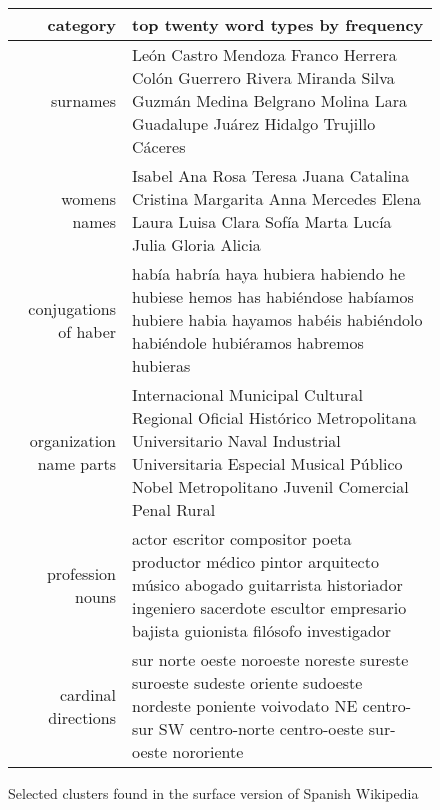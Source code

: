\begin{figure*}[t!]
  \begin{tabular}{|r|p{10cm}|}
    \hline
    category  & top twenty word types by frequency \\
    \hline
    surnames & León Castro Mendoza Franco Herrera Colón Guerrero Rivera Miranda
    Silva Guzmán Medina Belgrano Molina Lara Guadalupe Juárez Hidalgo Trujillo
    Cáceres \\
    \hline
    womens names & Isabel Ana Rosa Teresa Juana Catalina Cristina Margarita
    Anna Mercedes Elena Laura Luisa Clara Sofía Marta Lucía Julia Gloria Alicia
    \\
    \hline
    conjugations of haber & había habría haya hubiera habiendo he hubiese hemos
    has habiéndose habíamos hubiere habia hayamos habéis habiéndolo habiéndole
    hubiéramos habremos hubieras \\
    \hline
    organization name parts & Internacional Municipal Cultural Regional
    Oficial Histórico Metropolitana Universitario Naval Industrial
    Universitaria Especial Musical Público Nobel Metropolitano Juvenil
    Comercial Penal Rural \\
    \hline
    profession nouns & actor escritor compositor poeta productor médico pintor
    arquitecto músico abogado guitarrista historiador ingeniero sacerdote
    escultor empresario bajista guionista filósofo investigador \\
    \hline
    cardinal directions & sur norte oeste noroeste noreste sureste suroeste
    sudeste oriente sudoeste nordeste poniente voivodato NE centro-sur SW
    centro-norte centro-oeste sur-oeste nororiente \\
    \hline
  \end{tabular}
\caption{Selected clusters found in the surface version of Spanish Wikipedia}
\label{fig:clusters-wikipedia-surface}
\end{figure*}

